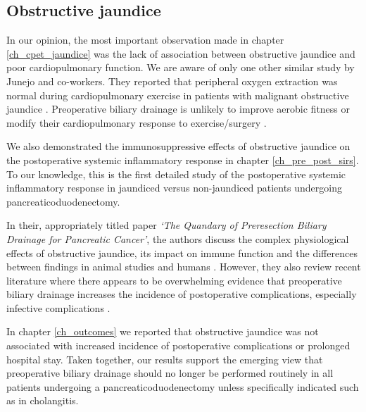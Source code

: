 \subsection{Obstructive jaundice}
In our opinion, the most important observation made in chapter \ref{ch_cpet_jaundice} was the lack of association between obstructive jaundice and poor cardiopulmonary function. 
We are aware of only one other similar study by Junejo and co-workers. They reported that peripheral oxygen extraction was normal during cardiopulmonary exercise in patients with malignant obstructive jaundice \parencite{junejo_peripheral_2014}.
Preoperative biliary drainage is unlikely to improve aerobic fitness or modify their cardiopulmonary response to exercise/surgery \parencite{parker_serum_2014}.

We also demonstrated the immunosuppressive effects of obstructive jaundice on the postoperative systemic inflammatory response in chapter \ref{ch_pre_post_sirs}. 
To our knowledge, this is the first detailed study of the postoperative systemic inflammatory response in jaundiced versus non-jaundiced patients undergoing pancreaticoduodenectomy.

In their, appropriately titled paper \textit{`The Quandary of Preresection Biliary Drainage for Pancreatic Cancer'}, the authors discuss the complex physiological effects of obstructive jaundice, its impact on immune function and the differences between findings in animal studies and humans \parencite{tol_quandary_2012}.
However, they also review recent literature where there appears to be overwhelming evidence that preoperative biliary drainage increases the incidence of postoperative complications, especially infective complications \parencite{van_der_gaag_preoperative_2010, arkadopoulos_preoperative_2014, fujii_preoperative_2015, furukawa_negative_2015}.

In chapter \ref{ch_outcomes} we reported that obstructive jaundice was not associated with increased incidence of postoperative complications or prolonged hospital stay. 
Taken together, our results support the emerging view that preoperative biliary drainage should no longer be performed routinely in all patients undergoing a pancreaticoduodenectomy unless specifically indicated such as in cholangitis.

